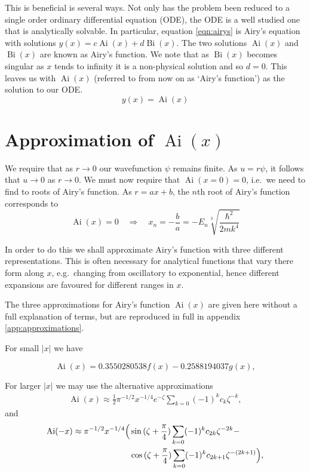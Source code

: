 \documentclass[]{article}
\renewcommand{\mod}[1]{\ensuremath{\lvert {#1} \rvert}}
\newcommand{\Ai}[1]{\ensuremath{\operatorname{Ai}({#1})}}
\newcommand{\Bi}[1]{\ensuremath{\operatorname{Bi}({#1})}}
\begin{document}
This is beneficial is several ways. Not only has the problem been reduced to a single order ordinary differential equation (ODE), the ODE is a well studied one that is analytically solvable. In particular, equation \ref{eqn:airys} is Airy's equation with solutions $y(x) = c\Ai{x} + d\Bi{x}$. The two solutions $\Ai{x}$ and $\Bi{x}$ are known as Airy's function. We note that as $\Bi{x}$ becomes singular as $x$ tends to infinity it is a non-physical solution and so $d = 0$. This leaves us with $\Ai{x}$ (referred to from now on as `Airy's function') as the solution to our ODE.\footnotemark
\[
y(x) = \Ai{x}
\]

\footnotetext{$\Ai{x} \to 0$ as $x \to \pm\infty$.}

\section{Approximation of \Ai{x}}\label{sec:approximation}

We require that as $r \to 0$ our wavefunction $\psi$ remains finite. As $u = r\psi$, it follows that $u \to 0$ as $r \to 0$. We must now require that $\Ai{x = 0} = 0$, i.e.\ we need to find to roots of Airy's function. As $r = ax + b$, the $n$th root of Airy's function corresponds to
\begin{equation}\label{eqn:rootexpression}
\Ai{x} = 0 \quad\Rightarrow\quad x_{n} = -\frac{b}{a} = -E_{n}\sqrt[3]{\frac{\hbar^{2}}{2mk^{4}}}
\end{equation}

In order to do this we shall approximate Airy's function with three different representations. This is often necessary for analytical functions that vary there form along $x$, e.g.\ changing from oscillatory to exponential, hence different expansions are favoured for different ranges in $x$.

The three approximations for Airy's function $\Ai{x}$ are given here without a full explanation of terms, but are reproduced in full in appendix \ref{app:approximations}.

For small $\mod{x}$ we have~\cite{ref:abramowitz}

\begin{equation}\label{eqn:airyfirst}
\Ai{x} = 0.3550280538f(x) - 0.2588194037g(x),
\end{equation}

For larger $\mod{x}$ we may use the alternative approximations
\begin{align}\label{eqn:airysecond}
\Ai{x} \approx \frac{1}{2}\pi^{-1/2}x^{-1/4}e^{-\zeta} \sum\limits_{k=0} (-1)^{k}c_{k}\zeta^{-k},
\end{align}
and
\begin{equation}\label{eqn:airythird}
	\begin{split}
		\Ai{-x} \approx \pi^{-1/2}x^{-1/4}
		\Bigl(
			&\sin{(\zeta + \frac{\pi}{4})}\sum\limits_{k=0}(-1)^{k}c_{2k}\zeta^{-2k} -\\
			&\cos{(\zeta + \frac{\pi}{4})}\sum\limits_{k=0}(-1)^{k}c_{2k+1}\zeta^{-(2k+1)}
		\Bigr),
	\end{split}
\end{equation}
\end{document}
